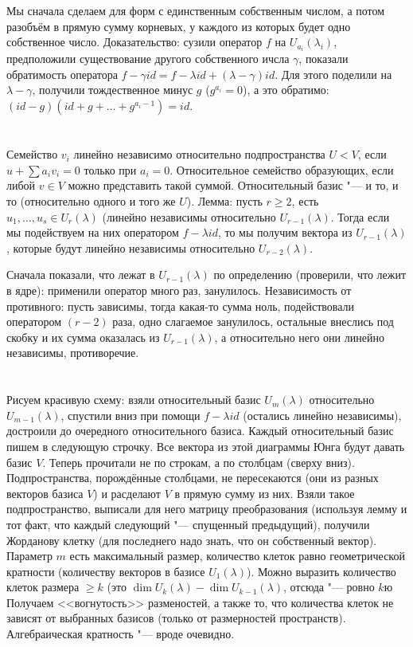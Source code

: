 Мы сначала сделаем для форм с единственным собственным числом, а потом разобъём в прямую сумму корневых, у каждого из которых будет одно собственное число.
Доказательство: сузили оператор $f$ на $U_{a_i}(\lambda_i)$, предположили существование другого собственного ичсла $\gamma$, показали обратимость оператора $f-\gamma id=f-\lambda id +(\lambda - \gamma)id$.
Для этого поделили на $\lambda - \gamma$, получили тождественное минус $g$ ($g^{a_i}=0$), а это обратимо: $(id-g)(id+g+\dots+g^{a_i-1})=id$.

\section{} %
Семейство $v_i$ линейно независимо относительно подпространства $U < V$, если $u + \sum a_i v_i = 0$ только при $a_i=0$.
Относительное семейство образующих, если либой $v \in V$ можно представить такой суммой.
Относительный базис "--- и то, и то (относительно одного и того же $U$).
Лемма: пусть $r \ge 2$, есть $u_1, \dots, u_s \in U_r(\lambda)$ (линейно независимы относительно $U_{r-1}(\lambda)$.
Тогда если мы подействуем на них оператором $f-\lambda id$, то мы получим вектора из $U_{r-1}(\lambda)$, которые будут линейно независимы относительно $U_{r-2}(\lambda)$.

Сначала показали, что лежат в $U_{r-1}(\lambda)$ по определению (проверили, что лежит в ядре): применили оператор много раз, занулилось.
Независимость от противного: пусть зависимы, тогда какая-то сумма ноль, подействовали оператором $(r-2)$ раза, одно слагаемое занулилось,
остальные внеслись под скобку и их сумма оказалась из $U_{r-1}(\lambda)$, а относительно него они линейно независимы, противоречие.

\section{} %
Рисуем красивую схему: взяли относительный базис $U_m(\lambda)$ относительно $U_{m-1}(\lambda)$, спустили вниз при помощи $f-\lambda id$ (остались линейно независимы), достроили до очередного относительного базиса.
Каждый относительный базис пишем в следующую строчку.
Все вектора из этой диаграммы Юнга будут давать базис $V$.
Теперь прочитали не по строкам, а по столбцам (сверху вниз).
Подпространства, порождённые столбцами, не пересекаются (они из разных векторов базиса $V$) и расделают $V$ в прямую сумму из них.
Взяли такое подпространство, выписали для него матрицу преобразования (используя лемму и тот факт, что каждый следующий "--- спущенный предыдущий), получили Жорданову клетку (для последнего надо знать, что он собственный вектор).
Параметр $m$ есть максимальный размер, количество клеток равно геометрической кратности (количеству векторов в базисе $U_1(\lambda)$).
Можно выразить количество клеток размера $\ge k$ (это $\dim U_k(\lambda) - \dim U_{k-1} (\lambda)$, отсюда "--- ровно $k$ю
Получаем <<вогнутость>> разменостей, а также то, что количества клеток не зависят от выбранных базисов (только от размерностей пространств).
Алгебраическая кратность "--- вроде очевидно.

